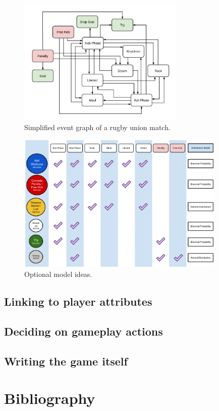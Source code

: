 \documentclass{book}
\begin{document}
\begin{figure}[h]
\includegraphics[width=8cm]{images/trywizard-event-graph.png}
\caption{Simplified event graph of a rugby union match.}
\label{fig:event-graph}
\end{figure}

\begin{figure}[h]
\includegraphics[width=10cm]{images/trywizard-model-ideas-sketch.png}
\caption{Optional model ideas.}
\label{fig:model-ideas}
\end{figure}

\section{\sffamily Linking to player attributes}

\section{\sffamily Deciding on gameplay actions}

\section{\sffamily Writing the game itself}

\backmatter
\chapter*{Bibliography}


\end{document}
